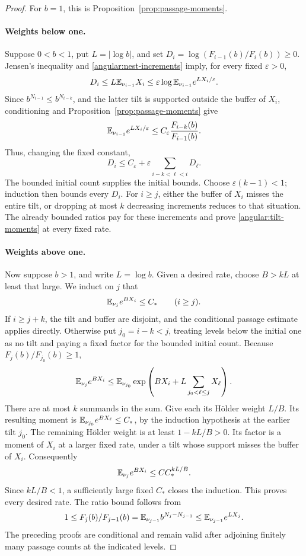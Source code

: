 \begin{proof}
For \(b=1\), this is Proposition~\ref{prop:passage-moments}.
\paragraph{Weights below one.}
Suppose \(0<b<1\), put \(L=|\log b|\), and set
\(D_i=\log(F_{i-1}(b)/F_i(b))\ge0\).
Jensen's inequality and \eqref{angular:nest-increments} imply,
for every fixed \(\varepsilon>0\),
\[
 D_i\le L\mathbb E_{\nu_{i-1}}X_i
 \le\varepsilon\log
       \mathbb E_{\nu_{i-1}}e^{LX_i/\varepsilon}.
\]
Since \(b^{N_{i-1}}\le b^{N_{i-k}}\), and the latter tilt
is supported outside the buffer of \(X_i\), conditioning and
Proposition~\ref{prop:passage-moments} give
\[
 \mathbb E_{\nu_{i-1}}e^{LX_i/\varepsilon}
 \le C_{\varepsilon}\frac{F_{i-k}(b)}{F_{i-1}(b)}.
\]
Thus, changing the fixed constant,
\begin{equation}\label{angular:decreasing-tilt-induction}
 D_i\le C_{\varepsilon}
          +\varepsilon\sum_{i-k<\ell<i}D_\ell.
\end{equation}
The bounded initial count supplies the initial bounds.  Choose
\(\varepsilon(k-1)<1\); induction then bounds every \(D_i\).
For \(i\ge j\), either the buffer of \(X_i\) misses the entire
tilt, or dropping at most \(k\) decreasing increments reduces
to that situation.  The already bounded ratios pay for these
increments and prove \eqref{angular:tilt-moments} at every
fixed rate.

\paragraph{Weights above one.}
Now suppose \(b>1\), and write \(L=\log b\).  Given a desired
rate, choose \(B>kL\) at least that large.  We induct on \(j\)
that
\[
 \mathbb E_{\nu_j}e^{BX_i}\le C_*\qquad(i\ge j).
\]
If \(i\ge j+k\), the tilt and buffer are disjoint, and the
conditional passage estimate applies directly.  Otherwise put
\(j_0=i-k<j\), treating levels below the initial one as no tilt
and paying a fixed factor for the bounded initial count.
Because \(F_j(b)/F_{j_0}(b)\ge1\),
\[
 \mathbb E_{\nu_j}e^{BX_i}
 \le
 \mathbb E_{\nu_{j_0}}\exp\left(
       BX_i+L\sum_{j_0<\ell\le j}X_\ell\right).
\]
There are at most \(k\) summands in the sum.  Give each its
H\"older weight \(L/B\).  Its resulting moment is
\(\mathbb E_{\nu_{j_0}}e^{BX_\ell}\le C_*\), by the induction
hypothesis at the earlier tilt \(j_0\).  The remaining H\"older
weight is at least \(1-kL/B>0\).  Its factor is a moment of
\(X_i\) at a larger fixed rate, under a tilt whose support
misses the buffer of \(X_i\).  Consequently
\[
 \mathbb E_{\nu_j}e^{BX_i}\le C C_*^{kL/B}.
\]
Since \(kL/B<1\), a sufficiently large fixed \(C_*\) closes
the induction.  This proves every desired rate.  The ratio
bound follows from
\[
 1\le F_j(b)/F_{j-1}(b)
    =\mathbb E_{\nu_{j-1}}b^{N_j-N_{j-1}}
    \le\mathbb E_{\nu_{j-1}}e^{LX_j}.
\]
The preceding proofs are conditional and remain valid after
adjoining finitely many passage counts at the indicated levels.


\end{proof}
